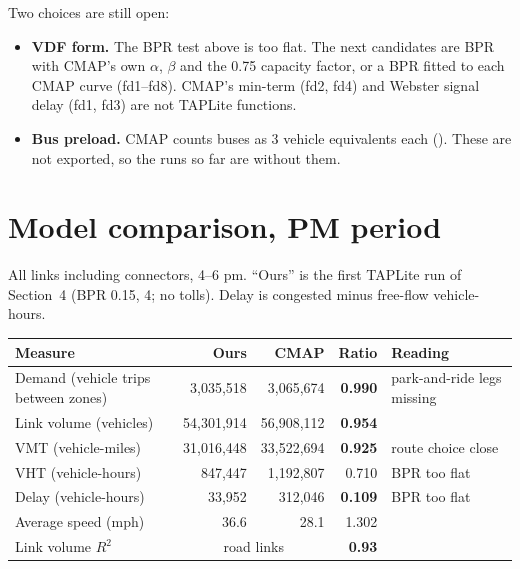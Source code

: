 \documentclass[10pt,a4paper]{extarticle}
\newcommand{\C}[1]{\texttt{\small\detokenize{#1}}}
\newcommand{\ok}[1]{\textcolor{good}{\textbf{#1}}}
\newcommand{\md}[1]{\textcolor{warn}{#1}}
\newcommand{\bd}[1]{\textcolor{bad}{\textbf{#1}}}
\begin{document}
\begin{center}
\colorbox{panel}{\parbox{0.96\textwidth}{\vspace{2pt}
Two choices are still open:
\begin{itemize}\setlength{\itemsep}{1pt}
\item \textbf{VDF form.} The BPR test above is too flat. The next candidates are BPR with CMAP's own $\alpha$,
$\beta$ and the 0.75 capacity factor, or a BPR fitted to each CMAP curve (fd1--fd8). CMAP's min-term (fd2, fd4)
and Webster signal delay (fd1, fd3) are not TAPLite functions.
\item \textbf{Bus preload.} CMAP counts buses as 3 vehicle equivalents each (\C{el2}). These are not exported,
so the runs so far are without them.
\end{itemize}\vspace{2pt}}}
\end{center}

\section{Model comparison, PM period}

All links including connectors, 4--6 pm. ``Ours'' is the first TAPLite run of Section~4 (BPR 0.15, 4; no
tolls). Delay is congested minus free-flow vehicle-hours.

\begin{center}
\begin{tabular}{@{}lrrrl@{}}
\toprule
\textbf{Measure} & \textbf{Ours} & \textbf{CMAP} & \textbf{Ratio} & \textbf{Reading} \\
\midrule
Demand (vehicle trips between zones) & 3,035,518 & 3,065,674 & \ok{0.990} & park-and-ride legs missing \\
Link volume (vehicles) & 54,301,914 & 56,908,112 & \ok{0.954} & \\
VMT (vehicle-miles)    & 31,016,448 & 33,522,694 & \ok{0.925} & route choice close \\
VHT (vehicle-hours)    & 847,447    & 1,192,807  & \md{0.710} & BPR too flat \\
Delay (vehicle-hours)  & 33,952     & 312,046    & \bd{0.109} & BPR too flat \\
Average speed (mph)    & 36.6       & 28.1       & \md{1.302} & \\
Link volume $R^2$      & \multicolumn{2}{c}{road links} & \ok{0.93} & \\
\bottomrule
\end{tabular}
\end{center}
\end{document}
